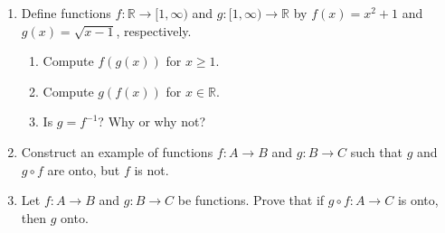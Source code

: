 \documentclass[12pt]{article}
\newcommand{\points}[1]{\marginpar{\hspace{24pt}[#1]}}
\newcommand{\R}{\mathbb{R}}
\begin{document}
\thispagestyle{fancy}

 \begin{enumerate}
 \item Define functions $f:\R\to [1,\infty)$ and $g:[1,\infty)\to \R$ by $f(x)=x^2+1$ and $g(x)=\sqrt{x-1}$, respectively.
\begin{enumerate}
 \item Compute $f(g(x))$ for $x\geq 1$. \points{2}

\vspace{2.5in}

 \item Compute $g(f(x))$ for $x\in\R$. \points{2}

\vspace{2.5in}

 \item Is $g=f^{-1}$? Why or why not? \points{1}

\end{enumerate}
\newpage

\item Construct an example of functions $f:A\to B$ and $g:B\to C$ such that $g$ and $g\circ f$ are onto, but $f$ is not. \points{3}

\vspace{3in}

\item Let $f:A\to B$ and $g:B\to C$ be functions. Prove that if $g\circ f :A\to C$ is onto, then $g$ onto. \points{2}
 \end{enumerate}
\end{document}
